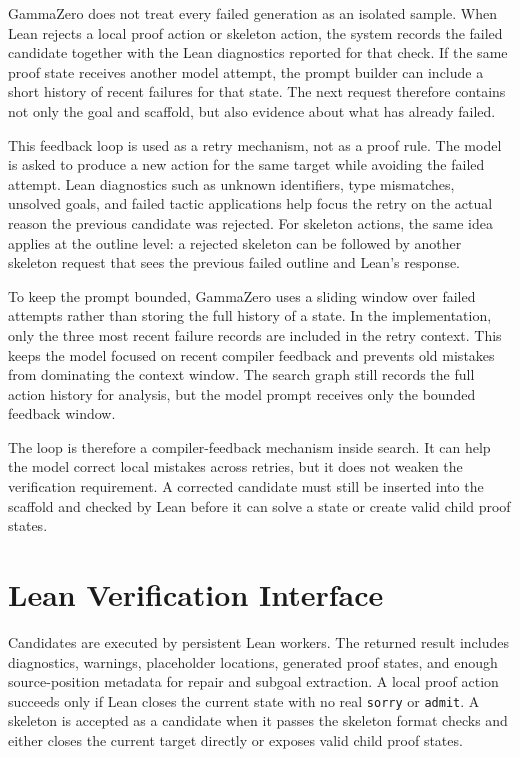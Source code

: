 GammaZero does not treat every failed generation as an isolated sample. When Lean rejects a local proof
action or skeleton action, the system records the failed candidate together with the Lean diagnostics
reported for that check. If the same proof state receives another model attempt, the prompt builder can
include a short history of recent failures for that state. The next request therefore contains not only the
goal and scaffold, but also evidence about what has already failed.

This feedback loop is used as a retry mechanism, not as a proof rule. The model is asked to produce a
new action for the same target while avoiding the failed attempt. Lean diagnostics such as unknown
identifiers, type mismatches, unsolved goals, and failed tactic applications help focus the retry on the
actual reason the previous candidate was rejected. For skeleton actions, the same idea applies at the
outline level: a rejected skeleton can be followed by another skeleton request that sees the previous
failed outline and Lean's response.

To keep the prompt bounded, GammaZero uses a sliding window over failed attempts rather than storing
the full history of a state. In the implementation, only the three most recent failure records are included
in the retry context. This keeps the model focused on recent compiler feedback and prevents old
mistakes from dominating the context window. The search graph still records the full action history for
analysis, but the model prompt receives only the bounded feedback window.

The loop is therefore a compiler-feedback mechanism inside search. It can help the model correct local
mistakes across retries, but it does not weaken the verification requirement. A corrected candidate must
still be inserted into the scaffold and checked by Lean before it can solve a state or create valid child
proof states.

\section{Lean Verification Interface}

Candidates are executed by persistent Lean workers. The returned result includes diagnostics, warnings, placeholder locations, generated proof states, and enough source-position metadata for repair and subgoal extraction. A local proof action succeeds only if Lean closes the current state with no real \texttt{sorry} or \texttt{admit}. A skeleton is accepted as a candidate when it passes the skeleton format checks and either closes the current target directly or exposes valid child proof states.

